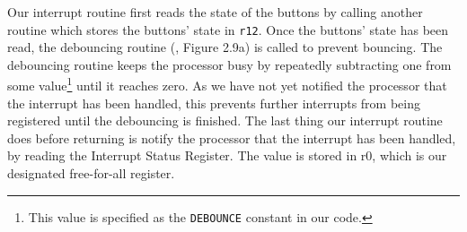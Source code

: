 Our interrupt routine first reads the state of the buttons by calling another routine which stores the buttons' state in \texttt{r12}.
Once the buttons' state has been read, the debouncing routine (\cite{lab-compendium}, Figure 2.9a) is called to prevent bouncing. 
The debouncing routine keeps the processor busy by repeatedly subtracting one from some value\footnote{This value is specified as the \texttt{DEBOUNCE} constant in our code.} until it reaches zero. As we have not yet notified the processor that the interrupt has been handled, this prevents further interrupts from being registered until the debouncing is finished.
The last thing our interrupt routine does before returning is notify the processor that the interrupt has been handled, by reading the Interrupt Status Register. The value is stored in r0, which is our designated free-for-all register.
